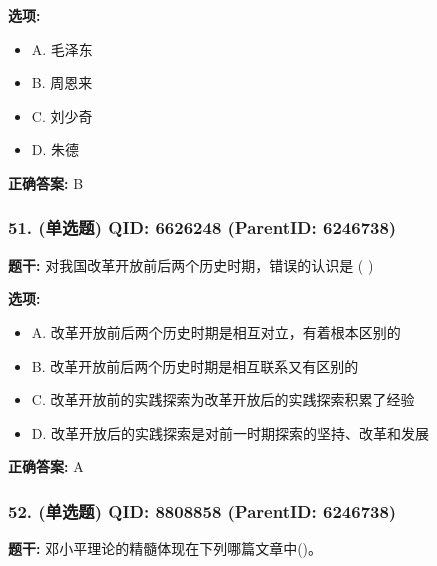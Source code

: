 \documentclass[12pt,UTF8]{ctexart}
\begin{document}
\textbf{选项:}
\begin{itemize}[leftmargin=*]

  \item A. 毛泽东

  \item B. 周恩来

  \item C. 刘少奇

  \item D. 朱德

\end{itemize}

\textbf{正确答案:}
B

\vspace{0.3em}\hrulefill\vspace{0.7em}

\subsubsection*{51. (单选题) \small QID: 6626248 (ParentID: 6246738)}

\textbf{题干:}
对我国改革开放前后两个历史时期，错误的认识是  ( )



\textbf{选项:}
\begin{itemize}[leftmargin=*]

  \item A. 改革开放前后两个历史时期是相互对立，有着根本区别的

  \item B. 改革开放前后两个历史时期是相互联系又有区别的

  \item C. 改革开放前的实践探索为改革开放后的实践探索积累了经验

  \item D. 改革开放后的实践探索是对前一时期探索的坚持、改革和发展

\end{itemize}

\textbf{正确答案:}
A

\vspace{0.3em}\hrulefill\vspace{0.7em}

\subsubsection*{52. (单选题) \small QID: 8808858 (ParentID: 6246738)}

\textbf{题干:}
邓小平理论的精髓体现在下列哪篇文章中()。
\end{document}
